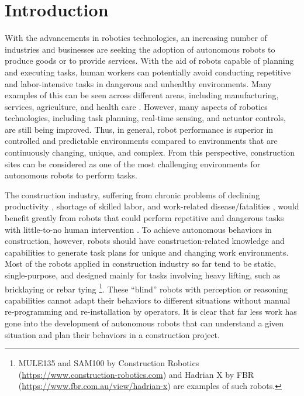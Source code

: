 \section{Introduction}
With the advancements in robotics technologies, an increasing number of industries and businesses are seeking the adoption of autonomous robots to produce goods or to provide services. With the aid of robots capable of planning and executing tasks, human workers can potentially avoid conducting repetitive and labor-intensive tasks in dangerous and unhealthy environments. Many examples of this can be seen across different areas, including manufacturing,  %
services, %
agriculture, %
and health care \cite{ding2020hidden,riek2017healthcare}. However, many aspects of robotics technologies, including task planning, real-time sensing, and actuator controls, are still being improved. Thus, in general, robot performance is superior in controlled and predictable environments compared to environments that are continuously changing, unique, and complex. From this perspective, construction sites can be considered as one of the most challenging environments for autonomous robots to perform tasks.

The construction industry, suffering from chronic problems of declining productivity  %
, shortage of skilled labor, %
and work-related disease/fatalities \cite{BLS2019,OSHA2019}, would benefit greatly from robots that could perform repetitive and dangerous tasks with little-to-no human intervention \cite{bock2015future}. To achieve autonomous behaviors in construction, however, robots should have construction-related knowledge and capabilities to generate task plans for unique and changing work environments. Most of the robots applied in construction industry so far tend to be static, single-purpose, and designed mainly for tasks involving heavy lifting, such as bricklaying \cite{bricklaying1} or rebar tying \cite{rebar1}\footnote{MULE135 and SAM100 by Construction Robotics (\href{https://www.construction-robotics.com}{https://www.construction-robotics.com}) and Hadrian X by FBR (\href{https://www.fbr.com.au/view/hadrian-x}{https://www.fbr.com.au/view/hadrian-x}) are examples of such robots.}. These ``blind'' robots with perception or reasoning capabilities cannot adapt their behaviors to different situations without manual re-programming and re-installation by operators. It is clear that far less work has gone into the development of autonomous robots that can understand a given situation and plan their behaviors in a construction project.


